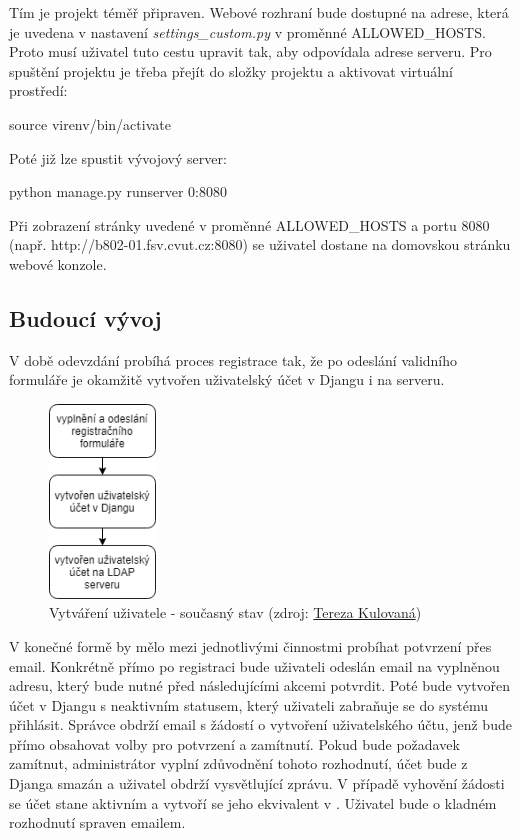 Tím je projekt téměř připraven. Webové rozhraní bude dostupné na
adrese, která je uvedena v nastavení \textit{settings\_custom.py} v
proměnné \textsf{ALLOWED\_HOSTS}. Proto musí uživatel tuto cestu
upravit tak, aby odpovídala adrese serveru. Pro spuštění projektu je
třeba přejít do složky projektu a aktivovat virtuální prostředí:
\begin{center}
\textsf{source virenv/bin/activate}
\end{center}

Poté již lze spustit vývojový server:

\begin{center}
\textsf{python manage.py runserver 0:8080}
\end{center}

Při zobrazení stránky uvedené v proměnné \textsf{ALLOWED\_HOSTS} a
portu 8080 (např. http://b802-01.fsv.cvut.cz:8080) se uživatel dostane
na domovskou stránku webové konzole.

\subsection{Budoucí vývoj}
\label{python-knihovna}

V době odevzdání probíhá proces registrace tak, že po odeslání
validního formuláře je okamžitě vytvořen uživatelský účet v Djangu i
na  serveru.

\begin{figure}[H] \centering
    \includegraphics[width=80pt]{./pictures/my_console_current_version_cz.png}
    \caption[Vytváření uživatele - současný stav]{Vytváření uživatele - současný stav (zdroj:
	\href{}{Tereza Kulovaná})}
    \label{fig:admin-current}
\end{figure}
  
V konečné formě by mělo mezi jednotlivými činnostmi probíhat potvrzení
přes email. Konkrétně přímo po registraci bude uživateli odeslán email
na vyplněnou adresu, který bude nutné před následujícími akcemi
potvrdit. Poté bude vytvořen účet v Djangu s neaktivním statusem,
který uživateli zabraňuje se do systému přihlásit. Správce obdrží
email s žádostí o vytvoření uživatelského účtu, jenž bude přímo
obsahovat volby pro potvrzení a zamítnutí. Pokud bude požadavek
zamítnut, administrátor vyplní zdůvodnění tohoto rozhodnutí, účet bude
z Djanga smazán a uživatel obdrží vysvětlující zprávu. V případě
vyhovění žádosti se účet stane aktivním a vytvoří se jeho ekvivalent v
. Uživatel bude o kladném rozhodnutí spraven emailem.
  
